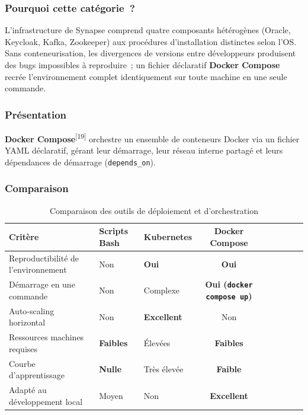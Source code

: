 \subsubsection*{Pourquoi cette catégorie~?}

L'infrastructure de Synapse comprend quatre composants hétérogènes (Oracle, Keycloak, Kafka, Zookeeper) aux procédures d'installation distinctes selon l'OS. Sans conteneurisation, les divergences de versions entre développeurs produisent des bugs impossibles à reproduire~; un fichier déclaratif \textbf{Docker Compose} recrée l'environnement complet identiquement sur toute machine en une seule commande.

\subsubsection*{Présentation}

\textbf{Docker Compose}\textsuperscript{[19]} orchestre un ensemble de conteneurs Docker via un fichier
YAML déclaratif, gérant leur démarrage, leur réseau interne partagé et leurs
dépendances de démarrage (\texttt{depends\_on}).

\subsubsection*{Comparaison}

\begin{table}[H]
\centering
\caption{Comparaison des outils de déploiement et d'orchestration}
\label{tab:cmp_docker}
\begin{tabularx}{\textwidth}{VlVCVCVCV}
\hline
\textbf{Critère} & \textbf{Scripts Bash} & \textbf{Kubernetes} & \textbf{Docker Compose} \\
\hline
Reproductibilité de l'environnement & Non & \textbf{Oui} & \textbf{Oui} \\
\hline
Démarrage en une commande    & Non      & Complexe     & \textbf{Oui (\texttt{docker compose up})} \\
\hline
Auto-scaling horizontal      & Non      & \textbf{Excellent} & Non \\
\hline
Ressources machines requises & \textbf{Faibles} & Élevées & \textbf{Faibles} \\
\hline
Courbe d'apprentissage       & \textbf{Nulle} & Très élevée & \textbf{Faible} \\
\hline
Adapté au développement local & Moyen   & Non          & \textbf{Excellent} \\
\hline
\end{tabularx}
\end{table}

